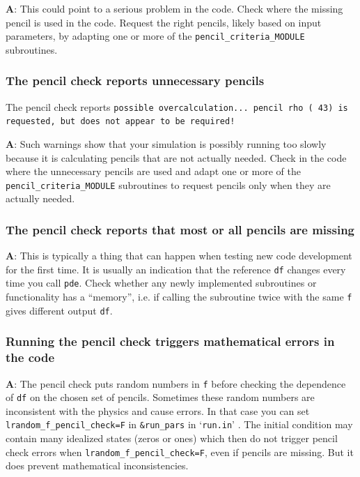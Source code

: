 \documentclass[\mydriver,12pt,twoside,notitlepage,a4paper]{article}
\makeatletter
\newcommand{\code}[1]{\texttt{#1}}
\newcommand{\file}[2][]{%
  \def\index@{#1}%
  `\texttt{#2}'%
  \ifx\index@\@empty\index[file]{#2@\texttt{#2}}%
  \else\index[file]{#1@\texttt{#1}}%
  \fi%
}
\makeatother
\begin{document}
\medskip

{\bf A}: This could point to a serious problem in the code. Check where the
missing pencil is used in the code. Request the right pencils, likely based on
input parameters, by adapting one or more of the \code{pencil_criteria_MODULE}
subroutines.

\subsubsection{The pencil check reports unnecessary pencils}

The pencil check reports
\code{possible overcalculation... pencil rho (  43) is requested, but does not
appear to be required!}

\medskip

{\bf A}: Such warnings show that your simulation is possibly running too slowly
because it is calculating pencils that are not actually needed. Check in the
code where the unnecessary pencils are used and adapt one or more of the
\code{pencil_criteria_MODULE} subroutines to request pencils only when they are
actually needed.

\subsubsection{The pencil check reports that most or all pencils are missing}

\medskip

{\bf A}: This is typically a thing that can happen when testing new code
development for the first time. It is usually an indication that the reference
\code{df} changes every time you call \code{pde}. Check whether any newly
implemented subroutines or functionality has a ``memory'', i.e. if calling the
subroutine twice with the same \code{f} gives different output \code{df}.

\subsubsection{Running the pencil check triggers mathematical errors in the code}

{\bf A}: The pencil check puts random numbers in \code{f} before checking the
dependence of \code{df} on the chosen set of pencils. Sometimes these random
numbers are inconsistent with the physics and cause errors. In that case you
can set \code{lrandom_f_pencil_check=F} in \code{\&run_pars} in \file{run.in}.
The initial condition may contain many idealized states (zeros or ones) which
then do not trigger pencil check errors when \code{lrandom_f_pencil_check=F},
even if pencils are missing. But it does prevent mathematical inconsistencies.
\end{document}
